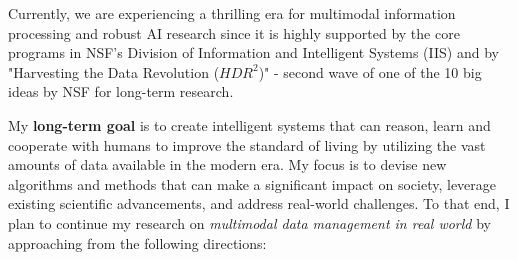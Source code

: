 \noindent Currently, we are experiencing a thrilling era for multimodal information processing and robust AI research since it is highly supported by the core programs in NSF's Division of Information and Intelligent Systems (IIS) and by "Harvesting the Data Revolution ($HDR^2$)" - second wave of one of the 10 big ideas
by NSF for long-term research.


\noindent My \textbf{long-term goal} is to create intelligent systems that can reason, learn and cooperate with humans to improve the standard of living by utilizing the vast amounts of data available in the modern era. My focus is to devise new algorithms and methods that can make a significant impact on society, leverage existing scientific advancements, and address real-world challenges. To that end, I
plan to continue my research on \textit{multimodal data management in real world} by approaching from the following directions:

